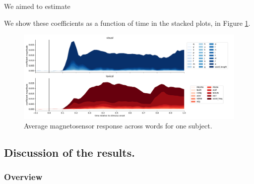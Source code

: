 We aimed to estimate

We show these coefficients as a function of time in the stacked plots, in Figure
\ref{fig:megresult}.

\begin{figure}
  \centering
  \includegraphics[width=\textwidth, trim=1.5cm 1cm 0.5cm 0cm,
clip=True]{meg_result.pdf}
  \caption{Average magnetosensor response across words for one subject.}
  \label{fig:megresult}
\end{figure}



\subsection{Discussion of the results.}

\subsubsection{Overview}
